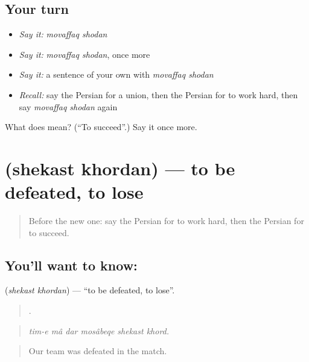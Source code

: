 \subsection*{Your turn}
\begin{itemize}
\raggedright
  \item \emph{Say it:} \emph{movaffaq shodan}
  \item \emph{Say it:} \emph{movaffaq shodan}, once more
  \item \emph{Say it:} a sentence of your own with \emph{movaffaq shodan}
  \item \emph{Recall:} say the Persian for a union, then the Persian for to work hard, then say \emph{movaffaq shodan} again
\end{itemize}

\begin{tcolorbox}[breakable,colback=teal!4,colframe=teal!35!black,title={Before you move on}]
What does   mean? (\textquotedblleft{}To succeed\textquotedblright{}.) Say it once more.
\end{tcolorbox}
\section[\texorpdfstring{\fa{شکست} \fa{خوردن} (shekast khordan)}{شکست خوردن (shekast khordan)}]{  (shekast khordan) — to be defeated, to lose}

\label{lesson:FA-C384-shekast-khordan}



\begin{quote}
Before the new one: say the Persian for to work hard, then the Persian for to succeed.
\end{quote}

\subsection*{You'll want to know:  }
\textbf{ } (\emph{shekast khordan}) — \textquotedblleft{}to be defeated, to lose\textquotedblright{}.

\begin{quote}
     .
\end{quote}

\begin{quote}
\emph{tim-e mâ dar mosâbeqe shekast khord.}
\end{quote}

\begin{quote}
Our team was defeated in the match.
\end{quote}

